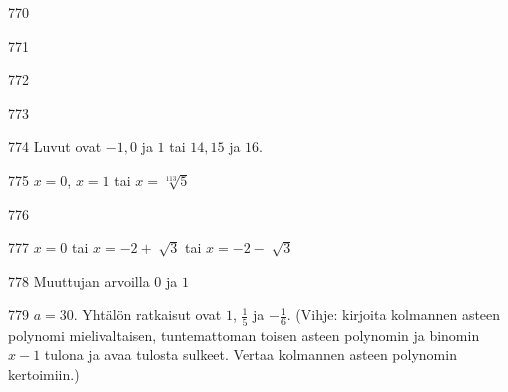 \begin{Vastaus}{770}
    
\end{Vastaus}
\begin{Vastaus}{771}
\end{Vastaus}
\begin{Vastaus}{772}
    
\end{Vastaus}
\begin{Vastaus}{773}
    
\end{Vastaus}
\begin{Vastaus}{774}
	Luvut ovat $-1, 0$ ja $1$ tai $14, 15$ ja $16$.
    
\end{Vastaus}
\begin{Vastaus}{775}
		$x = 0$, $x = 1$ tai $x = \sqrt[113]{5}$
	
\end{Vastaus}
\begin{Vastaus}{776}
    
\end{Vastaus}
\begin{Vastaus}{777}
	$x=0$ tai $x=-2 + \sqrt[]{3}$ tai $x=-2 - \sqrt[]{3}$
	
\end{Vastaus}
\begin{Vastaus}{778}
Muuttujan arvoilla $0$ ja $1$
	
\end{Vastaus}
\begin{Vastaus}{779}
      $a=30$. Yhtälön ratkaisut ovat $1$, $\frac{1}{5}$ ja $-\frac{1}{6}$. (Vihje: kirjoita kolmannen asteen polynomi mielivaltaisen, tuntemattoman toisen asteen polynomin ja binomin $x-1$ tulona ja avaa tulosta sulkeet. Vertaa kolmannen asteen polynomin kertoimiin.)
    
\end{Vastaus}
